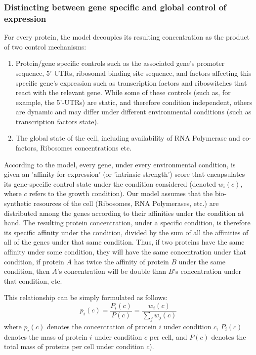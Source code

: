 \documentclass[notitlepage]{article}
\begin{document}
\subsubsection{Distincting between gene specific and global control of expression}
For every protein, the model decouples its resulting concentration as the product of two control mechanisms:
\begin{enumerate}
\item Protein/gene specific controls such as the associated gene's promoter sequence, 5'-UTRs, ribosomal binding site sequence, and factors affecting this specific gene's expression such as transcription factors and riboswitches that react with the relevant gene.
  While some of these controls (such as, for example, the 5'-UTRs) are static, and therefore condition independent, others are dynamic and may differ under different environmental conditions (such as transcription factors state).
\item The global state of the cell, including availability of RNA Polymerase and co-factors, Ribosomes concentrations etc.
\end{enumerate}
According to the model, every gene, under every environmental condition, is given an 'affinity-for-expression' (or 'intrinsic-strength') score that encapsulates its gene-specific control state under the condition considered (denoted $w_i(c)$, where $c$ refers to the growth condition).
Our model assumes that the bio-synthetic resources of the cell (Ribosomes, RNA Polymerases, etc.) are distributed among the genes according to their affinities under the condition at hand.
The resulting protein concentration, under a specific condition, is therefore its specific affinity under the condition, divided by the sum of all the affinities of all of the genes under that same condition.
Thus, if two proteins have the same affinity under some condition, they will have the same concentration under that condition, if protein $A$ has twice the affinity of protein $B$ under the same condition, then $A$'s concentration will be double than $B$'s concentration under that condition, etc.

This relationship can be simply formulated as follows:
\begin{equation}
  \label{eq:concentration-ratio}
  p_i(c)=\frac{P_i(c)}{P(c)}=\frac{w_i(c)}{\sum_jw_j(c)}
\end{equation}
where $p_i(c)$ denotes the concentration of protein $i$ under condition $c$, $P_i(c)$ denotes the mass of protein $i$ under condition $c$ per cell, and $P(c)$ denotes the total mass of proteins per cell under condition $c$).
\end{document}
